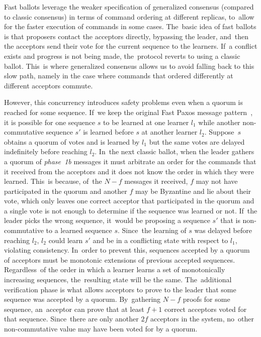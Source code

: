 \documentclass[algorithms,article,accept,moreauthors,pdftex,10pt,a4paper]{Definitions/mdpi}
\begin{document}
Fast ballots leverage the weaker specification of generalized consensus (compared to classic consensus) in terms of command ordering at different replicas, to~allow for the faster execution of commands in some cases. The~basic idea of fast ballots is that proposers contact the acceptors directly, bypassing the leader, and~then the acceptors send their vote for the current sequence to the learners. If~a conflict exists and progress is not being made, the~protocol reverts to using a classic ballot. This~is where generalized consensus allows us to avoid falling back to this slow path, namely in the case where commands that ordered differently at different acceptors commute. \par 
However, this concurrency introduces safety problems even when a quorum is reached for some sequence. If~we keep the original Fast Paxos message pattern~\cite{L06}, it is possible for one sequence $s$ to be learned at one learner $l_1$ while another non-commutative sequence $s'$ is learned before $s$ at another learner $l_2$. Suppose~$s$ obtains a quorum of votes and is learned by $l_1$ but the same votes are delayed indefinitely before reaching $l_2$. In~the next classic ballot, when the leader gathers a quorum of \textit{phase~1b} messages it must arbitrate an order for the commands that it received from the acceptors and it does not know the order in which they were learned. This~is because, of~the $N-f$ messages it received, $f$ may not have participated in the quorum and another $f$ may be Byzantine and lie about their vote, which only leaves one correct acceptor that participated in the quorum and a single vote is not enough to determine if the sequence was learned or not. If~the leader picks the wrong sequence, it~would be proposing a sequence $s'$ that is non-commutative to a learned sequence $s$. Since~the learning of $s$ was delayed before reaching $l_2$, $l_2$ could learn $s'$ and be in a conflicting state with respect to $l_1$, violating consistency. In~order to prevent this, sequences accepted by a quorum of acceptors must be monotonic extensions of previous accepted sequences. Regardless~of the order in which a learner learns a set of monotonically increasing sequences, the~resulting state will be the same. The~additional verification phase is what allows acceptors to prove to the leader that some sequence was accepted by a quorum. By~gathering $N-f$ proofs for some sequence, an~acceptor can prove that at least $f+1$ correct acceptors voted for that sequence. Since~there are only another $2f$ acceptors in the system, no~other non-commutative value may have been voted for by a quorum. \par
\end{document}
